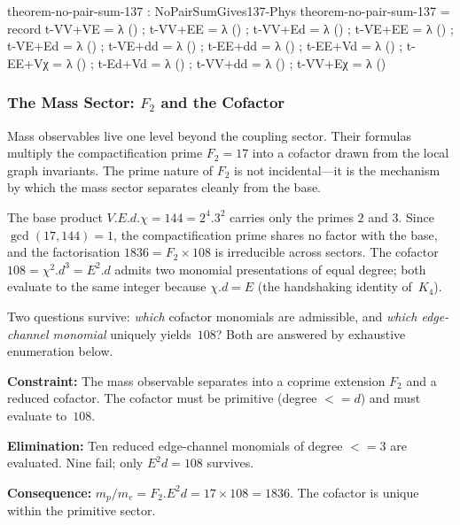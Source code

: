 \documentclass[11pt,a4paper]{book}
\def\cdot{.}%
\def\leq{<=}%
\begin{document}
\begin{code}
theorem-no-pair-sum-137 : NoPairSumGives137-Phys
theorem-no-pair-sum-137 = record
  { t-VV+VE = λ () ; t-VV+EE = λ () ; t-VV+Ed = λ ()
  ; t-VE+EE = λ () ; t-VE+Ed = λ () ; t-VE+dd = λ ()
  ; t-EE+dd = λ () ; t-EE+Vd = λ () ; t-EE+Vχ = λ ()
  ; t-Ed+Vd = λ () ; t-VV+dd = λ () ; t-VV+Eχ = λ ()
  }
\end{code}

\subsubsection*{The Mass Sector: $F_2$ and the Cofactor}

Mass observables live one level beyond the coupling sector.  Their
formulas multiply the compactification prime $F_2 = 17$ into a cofactor
drawn from the local graph invariants.  The prime nature of $F_2$ is
not incidental---it is the mechanism by which the mass sector separates
cleanly from the base.

The base product $V \cdot E \cdot d \cdot \chi = 144 = 2^4 \cdot 3^2$
carries only the primes $2$ and $3$.  Since $\gcd(17, 144) = 1$, the
compactification prime shares no factor with the base, and the
factorisation $1836 = F_2 \times 108$ is irreducible across sectors.
The cofactor $108 = \chi^2 \cdot d^3 = E^2 \cdot d$ admits two
monomial presentations of equal degree; both evaluate to the same
integer because $\chi \cdot d = E$ (the handshaking identity of~$K_4$).

Two questions survive: \emph{which} cofactor monomials are admissible,
and \emph{which edge-channel monomial} uniquely yields~$108$?  Both
are answered by exhaustive enumeration below.

\textbf{Constraint:}
The mass observable separates into a coprime extension $F_2$ and a
reduced cofactor.  The cofactor must be primitive (degree $\leq d$)
and must evaluate to~$108$.

\textbf{Elimination:}
Ten reduced edge-channel monomials of degree $\leq 3$ are
evaluated.  Nine fail; only $E^2 d = 108$ survives.

\textbf{Consequence:}
$m_p / m_e = F_2 \cdot E^2 d = 17 \times 108 = 1836$.  The
cofactor is unique within the primitive sector.
\end{document}
